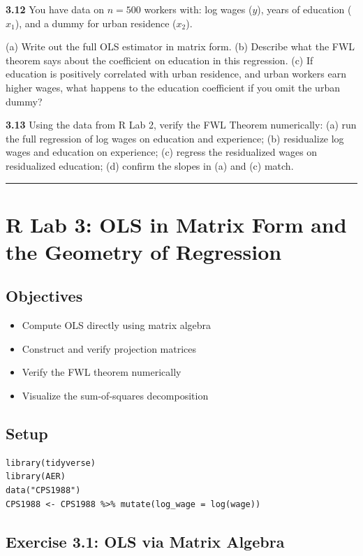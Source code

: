 \textbf{3.12} You have data on $n = 500$ workers with: log wages ($y$), years of education ($x_1$), and a dummy for urban residence ($x_2$). 

(a) Write out the full OLS estimator in matrix form.
(b) Describe what the FWL theorem says about the coefficient on education in this regression.
(c) If education is positively correlated with urban residence, and urban workers earn higher wages, what happens to the education coefficient if you omit the urban dummy?

\textbf{3.13} Using the data from R Lab 2, verify the FWL Theorem numerically: (a) run the full regression of log wages on education and experience; (b) residualize log wages and education on experience; (c) regress the residualized wages on residualized education; (d) confirm the slopes in (a) and (c) match.

\medskip\hrule\medskip

\section{R Lab 3: OLS in Matrix Form and the Geometry of Regression}

\subsection{Objectives}
\begin{itemize}
\item Compute OLS directly using matrix algebra
\item Construct and verify projection matrices
\item Verify the FWL theorem numerically
\item Visualize the sum-of-squares decomposition
\end{itemize}

\subsection{Setup}

\begin{lstlisting}
library(tidyverse)
library(AER)
data("CPS1988")
CPS1988 <- CPS1988 %>% mutate(log_wage = log(wage))
\end{lstlisting}

\subsection{Exercise 3.1: OLS via Matrix Algebra}


